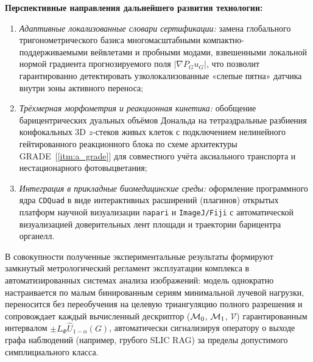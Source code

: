\textbf{Перспективные направления дальнейшего развития технологии:}
\begin{enumerate}
    \item \emph{Адаптивные локализованные словари сертификации:} замена глобального тригонометрического базиса многомасштабными компактно-поддерживаемыми вейвлетами и пробными модами, взвешенными локальной нормой градиента прогнозируемого поля $|\nabla P_G u_G|$, что позволит гарантированно детектировать узколокализованные «слепые пятна» датчика внутри зоны активного переноса;
    \item \emph{Трёхмерная морфометрия и реакционная кинетика:} обобщение барицентрических дуальных объёмов Дональда на тетраэдральные разбиения конфокальных 3D $z$-стеков живых клеток с подключением нелинейного гейтированного реакционного блока по схеме архитектуры GRADE~[\ref{itm:a_grade}] для совместного учёта аксиального транспорта и нестационарного фотовыцветания;
    \item \emph{Интеграция в прикладные биомедицинские среды:} оформление программного ядра \texttt{CDQuad} в виде интерактивных расширений (плагинов) открытых платформ научной визуализации \texttt{napari} и \texttt{ImageJ/Fiji} с автоматической визуализацией доверительных лент площади и траектории барицентра органелл.
\end{enumerate}

В совокупности полученные экспериментальные результаты формируют замкнутый метрологический регламент эксплуатации комплекса в автоматизированных системах анализа изображений: модель однократно настраивается по малым бинированным сериям минимальной лучевой нагрузки, переносится без переобучения на целевую триангуляцию полного разрешения и сопровождает каждый вычисленный дескриптор ($\mathcal{M}_0$, $\mathcal{M}_1$, $\mathcal{V}$) гарантированным интервалом $\pm L_\Phi\widehat{U}_{1-\alpha}(G)$, автоматически сигнализируя оператору о выходе графа наблюдений (например, грубого SLIC RAG) за пределы допустимого симплициального класса.

\newpage
